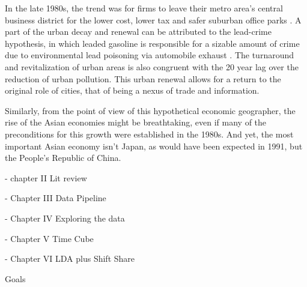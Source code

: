 In the late 1980s, the trend was for firms to leave their metro area's central business district for the lower cost, lower tax and safer suburban office parks \citep{bodenmanfirm2000}.  A part of the urban decay and renewal can be attributed to the lead-crime hypothesis, in which leaded gasoline is responsible for a sizable amount of crime due to environmental lead poisoning via automobile exhaust \citep{feigenbaum2016lead,NBERw23392}.  The turnaround and revitalization of urban areas is also congruent with the 20 year lag over the reduction of urban pollution.  This urban renewal allows for a return to the original role of cities, that of being a nexus of trade and information. 

Similarly, from the point of view of this hypothetical economic geographer, the rise of the Asian economies might be breathtaking, even if many of the preconditions for this growth were established in the 1980s.  And yet, the most important Asian economy isn't Japan, as would have been expected in 1991, but the People's Republic of China. 












- chapter II Lit review

- Chapter III Data Pipeline

- Chapter IV Exploring the data 

- Chapter V Time Cube

- Chapter VI LDA plus Shift Share

Goals 